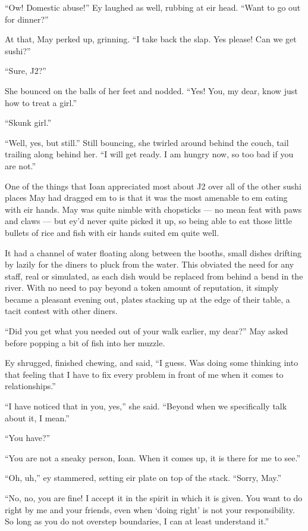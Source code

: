 ``Ow! Domestic abuse!'' Ey laughed as well, rubbing at eir head. ``Want to go out for dinner?''

At that, May perked up, grinning. ``I take back the slap. Yes please! Can we get sushi?''

``Sure, J2?''

She bounced on the balls of her feet and nodded. ``Yes! You, my dear, know just how to treat a girl.''

``Skunk girl.''

``Well, yes, but still.'' Still bouncing, she twirled around behind the couch, tail trailing along behind her. ``I will get ready. I am hungry now, so too bad if you are not.''

One of the things that Ioan appreciated most about J2 over all of the other sushi places May had dragged em to is that it was the most amenable to em eating with eir hands. May was quite nimble with chopsticks — no mean feat with paws and claws — but ey'd never quite picked it up, so being able to eat those little bullets of rice and fish with eir hands suited em quite well.

It had a channel of water floating along between the booths, small dishes drifting by lazily for the diners to pluck from the water. This obviated the need for any staff, real or simulated, as each dish would be replaced from behind a bend in the river. With no need to pay beyond a token amount of reputation, it simply became a pleasant evening out, plates stacking up at the edge of their table, a tacit contest with other diners.

``Did you get what you needed out of your walk earlier, my dear?'' May asked before popping a bit of fish into her muzzle.

Ey shrugged, finished chewing, and said, ``I guess. Was doing some thinking into that feeling that I have to fix every problem in front of me when it comes to relationships.''

``I have noticed that in you, yes,'' she said. ``Beyond when we specifically talk about it, I mean.''

``You have?''

``You are not a sneaky person, Ioan. When it comes up, it is there for me to see.''

``Oh, uh,'' ey stammered, setting eir plate on top of the stack. ``Sorry, May.''

``No, no, you are fine! I accept it in the spirit in which it is given. You want to do right by me and your friends, even when `doing right' is not your responsibility. So long as you do not overstep boundaries, I can at least understand it.''

